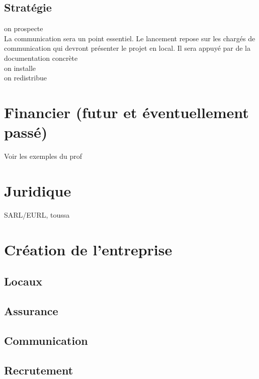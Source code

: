 \documentclass[10pt]{article}
\begin{document}
\subsection{Stratégie}
\label{sub:strategie}
on prospecte\\
La communication sera un point essentiel. Le lancement repose sur les chargés de communication qui devront présenter le projet en local. Il sera appuyé par de la documentation concrète \\
on installe\\
on redistribue\\


\section{Financier (futur et éventuellement passé)}
\label{sec:financier}
Voir les exemples du prof

\section{Juridique}
\label{sec:juridique}
SARL/EURL, toussa

\section{Création de l'entreprise}
\label{sec:creation_entreprise}

\subsection{Locaux}
\label{sub:locaux}

\subsection{Assurance}
\label{sub:assurance}


\subsection{Communication}
\label{sub:communication}


\subsection{Recrutement}
\label{sub:recrutement}
\end{document}
